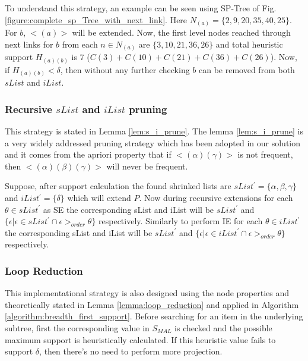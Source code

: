 To understand this strategy, an example can be seen using SP-Tree of Fig. \ref{figure:complete_sp_Tree_with_next_link}. Here $N_{(a)}=\{2, 9, 20, 35, 40, 25\}$. For $b$, $< (a) >$ will be extended. Now, the first level nodes reached through next links for $b$ from each $n \in N_{(a)}$ are $\{3, 10, 21, 36, 26\}$ and total heuristic support $H_{(a)(b)}$ is $7$ ($C(3)+C(10)+C(21)+C(36)+C(26)$). Now, if $H_{(a)(b)} < \delta$, then without any further checking $b$ can be removed from both $sList$ and $iList$.

\subsubsection{Recursive $sList$ and $iList$ pruning}
This strategy is stated in Lemma \ref{lem:s_i_prune}. The lemma \ref{lem:s_i_prune} is a very widely addressed pruning strategy which has been adopted in our solution and it comes from the apriori property that if $< (\alpha)(\gamma) >$ is not frequent, then $< (\alpha)(\beta)(\gamma) >$ will never be frequent.

\begin{lem} \label{lem:s_i_prune}
Suppose, after support calculation the found shrinked lists are $sList^{\prime}=\{\alpha,\beta,\gamma\}$ and $iList^{\prime}=\{ \delta \}$ which will extend $P$. Now during recursive extensions for each $\theta \in sList^{\prime}$ as SE the corresponding sList and iList will be $sList^{\prime}$ and $\{\epsilon \vert \epsilon \in sList^{\prime} \cap \epsilon >_{order} \theta\}$ respectively. Similarly to perform IE for each $\theta \in iList^{\prime}$ the corresponding sList and iList will be $sList^{\prime}$ and $\{\epsilon \vert \epsilon \in iList^{\prime} \cap \epsilon >_{order} \theta\}$ respectively.
\end{lem}

\subsubsection{Loop Reduction}
This implementational strategy is also designed using the node properties and theoretically stated in Lemma \ref{lemma:loop_reduction} and applied in Algorithm \ref{algorithm:breadth_first_support}. Before searching for an item in the underlying subtree, first the corresponding value in $S_{MAL}$ is checked and the possible maximum support is heuristically calculated. If this heuristic value fails to support $\delta$, then there's no need to perform more projection.

